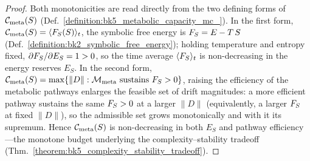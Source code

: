 \begin{proof}
\label{proof:bk5_metabolic_capacity_non_decreasing}
\leavevmode
Both monotonicities are read directly from the two defining forms of $\mathcal{C}_{\text{meta}}(S)$ (Def.~\ref{definition:bk5_metabolic_capacity_mc_}). In the first form, $\mathcal{C}_{\text{meta}}(S)=\langle F_S(S)\rangle_t$, the symbolic free energy is $F_S = E - T\,S$ (Def.~\ref{definition:bk2_symbolic_free_energy}); holding temperature and entropy fixed, $\partial F_S/\partial E_S = 1 > 0$, so the time average $\langle F_S\rangle_t$ is non-decreasing in the energy reserves $E_S$. In the second form, $\mathcal{C}_{\text{meta}}(S)=\max\{\|D\| : \mathcal{M}_{\mathrm{meta}}\text{ sustains }F_S>0\}$, raising the efficiency of the metabolic pathways enlarges the feasible set of drift magnitudes: a more efficient pathway sustains the same $F_S>0$ at a larger $\|D\|$ (equivalently, a larger $F_S$ at fixed $\|D\|$), so the admissible set grows monotonically and with it its supremum. Hence $\mathcal{C}_{\text{meta}}(S)$ is non-decreasing in both $E_S$ and pathway efficiency---the monotone budget underlying the complexity--stability tradeoff (Thm.~\ref{theorem:bk5_complexity_stability_tradeoff}).
\end{proof}
